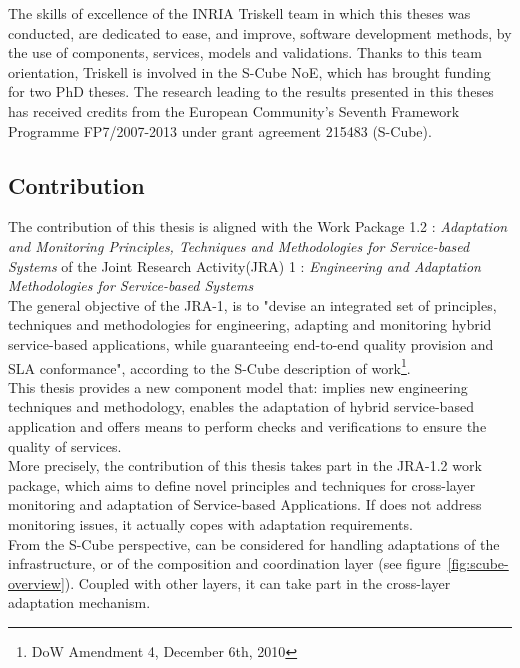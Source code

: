 The skills of excellence of the INRIA Triskell team in which this theses was conducted, are dedicated to ease, and improve, software development methods, by the use of components, services, models and validations. Thanks to this team orientation, Triskell is involved in the S-Cube NoE, which has brought funding for two PhD theses. The research leading to the results presented in this theses has received credits from the European Community’s Seventh Framework Programme FP7/2007-2013 under grant agreement 215483 (S-Cube).\\

\subsection{Contribution}

The contribution of this thesis is aligned with the Work Package 1.2 : {\it Adaptation and Monitoring Principles, Techniques and Methodologies for Service-based Systems} of the Joint Research Activity(JRA) 1 : {\it Engineering and Adaptation Methodologies for Service-based Systems}\\

The general objective of the JRA-1, is to "devise an integrated set of principles, techniques and methodologies for engineering, adapting and monitoring hybrid service-based applications, while guaranteeing end-to-end quality provision and SLA conformance", according to the S-Cube description of work\footnote{DoW Amendment 4, December 6th, 2010}.\\
This thesis provides a new component model that: implies new engineering techniques and methodology, enables the adaptation of hybrid service-based application and offers means to perform checks and verifications to ensure the quality of services.\\

More precisely, the contribution of this thesis takes part in the JRA-1.2 work package, which aims to define novel principles and techniques for cross-layer monitoring and adaptation of Service-based Applications. If \enti{} does not address monitoring issues, it actually copes with adaptation requirements.\\

From the S-Cube perspective, \enti{} can be considered for handling adaptations of the infrastructure, or of the composition and coordination layer (see figure~\ref{fig:scube-overview}). Coupled with other layers, it can take part in the cross-layer adaptation mechanism.







